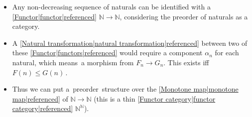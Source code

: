 
\begin{itemize}
    \item  Any non-decreasing sequence of naturals can be identified with a \ref{Functor|functor|referenced} $\mathbb{N}\rightarrow \mathbb{N}$, considering the preorder of naturals as a category.
    \item A \ref{Natural transformation|natural transformation|referenced} between two of these \ref{Functor|functors|referenced} would require a component $\alpha_n$ for each natural, which means \,a morphism from $F_n \rightarrow G_n$. This exists iff $F(n)\leq G(n)$\,.
    \item Thus we can put a \,preorder\, structure over the \ref{Monotone map|monotone map|referenced} of $\mathbb{N} \rightarrow \mathbb{N}$ (this is a thin \ref{Functor category|functor category|referenced} $\mathbb{N}^\mathbb{N}$).
  \end{itemize}
